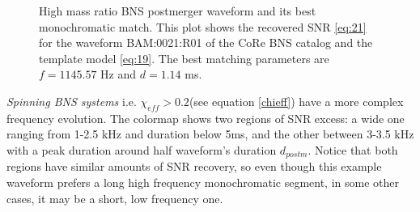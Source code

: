 \begin{figure}[!htbp]
\begin{center}
\begin{minipage}[t]{0.5\linewidth}
\end{minipage}
\captionsetup{width=0.8\textwidth}
\caption[High mass ratio BNS system's postmerger waveform and its best monochromatic match]{High mass ratio BNS postmerger waveform and its best monochromatic match. This plot shows the recovered SNR \ref{eq:21} for the waveform BAM:0021:R01 of the CoRe BNS catalog \cite{Dietrich:2018phi} and the template model \ref{eq:19}. The best matching parameters are $f=1145.57$ Hz and $d=1.14$ ms.}
\end{center}
\end{figure}

\FloatBarrier


\newpage

\textit{Spinning BNS systems} i.e. $\chi_{eff}>0.2$(see equation \ref{chieff}) have a more complex frequency evolution. The colormap shows two regions of SNR excess: a wide one ranging from 1-2.5 kHz and duration below 5ms, and the other between 3-3.5 kHz with a peak duration around half waveform's duration $d_{postm}$. Notice that both regions have similar amounts of SNR recovery, so even though this example waveform prefers a long high frequency monochromatic segment, in some other cases, it may be a short, low frequency one.

